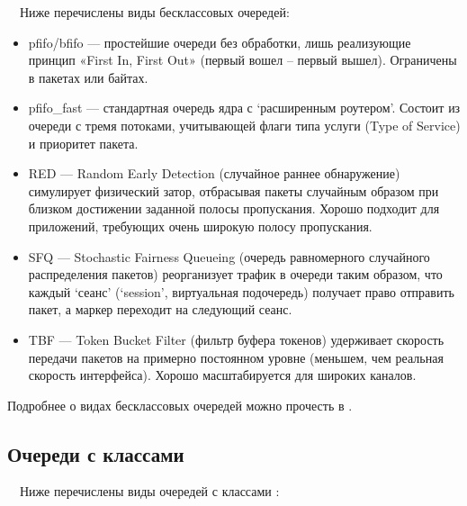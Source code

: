 \documentclass[
  13pt,
  fontsize=13pt,
  russian,
  a4paper,
,captions=tableheading
]{scrreprt}
\providecommand{\tightlist}{%
  \setlength{\itemsep}{0pt}\setlength{\parskip}{0pt}}
\begin{document}
\(\quad\)Ниже перечислены виды бесклассовых очередей:

\begin{itemize}
\tightlist
\item
  pfifo/bfifo --- простейшие очереди без обработки, лишь реализующие
  принцип «First In, First Out» (первый вошел -- первый вышел).
  Ограничены в пакетах или байтах.
\item
  pfifo\_fast --- стандартная очередь ядра с `расширенным роутером'.
  Состоит из очереди с тремя потоками, учитывающей флаги типа услуги
  (Type of Service) и приоритет пакета.
\item
  RED --- Random Early Detection (случайное раннее обнаружение)
  симулирует физический затор, отбрасывая пакеты случайным образом при
  близком достижении заданной полосы пропускания. Хорошо подходит для
  приложений, требующих очень широкую полосу пропускания.
\item
  SFQ --- Stochastic Fairness Queueing (очередь равномерного случайного
  распределения пакетов) реорганизует трафик в очереди таким образом,
  что каждый `сеанс' (`session', виртуальная подочередь) получает право
  отправить пакет, а маркер переходит на следующий сеанс.
\item
  TBF --- Token Bucket Filter (фильтр буфера токенов) удерживает
  скорость передачи пакетов на примерно постоянном уровне (меньшем, чем
  реальная скорость интерфейса). Хорошо масштабируется для широких
  каналов.
\end{itemize}

Подробнее о видах бесклассовых очередей можно прочесть в \autocite{tc}.

\hypertarget{ux43eux447ux435ux440ux435ux434ux438-ux441-ux43aux43bux430ux441ux441ux430ux43cux438}{%
\subsection{Очереди с
классами}\label{ux43eux447ux435ux440ux435ux434ux438-ux441-ux43aux43bux430ux441ux441ux430ux43cux438}}

\(\quad\)Ниже перечислены виды очередей с классами \autocite{tc}:
\end{document}
